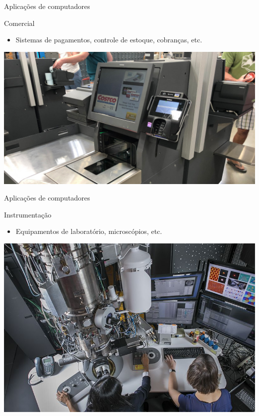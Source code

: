 \begin{frame}{Aplicações de computadores}
	\begin{block}{Comercial}
		\begin{itemize}
			\item Sistemas de pagamentos, controle de estoque, cobranças, etc.
		\end{itemize}
	\end{block}

	\bigskip

	\centering
	\includegraphics[width=0.9\linewidth]{Figuras/Ch01/fig15}
\end{frame}


\begin{frame}{Aplicações de computadores}
	\begin{block}{Instrumentação}
		\begin{itemize}
			\item Equipamentos de laboratório, microscópios, etc.
		\end{itemize}
	\end{block}

	\centering
	\includegraphics[width=0.7\linewidth]{Figuras/Ch01/fig14}
\end{frame}


